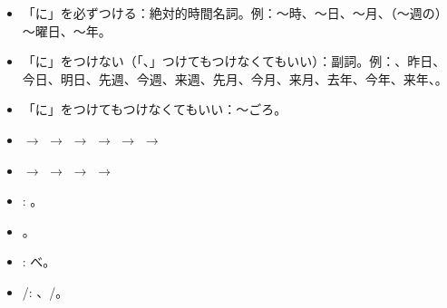 \documentclass[a4paper,12pt]{article}
\begin{document}
\begin{itemize}
\item 「に」を必ずつける：絶対的時間名詞。例：〜時、～日、～月、（〜週の）～曜日、～年。
\item 「に」をつけない（「、」つけてもつけなくてもいい）：副詞。例：、昨日、今日、明日、先週、今週、来週、先月、今月、来月、去年、今年、来年、。
\item 「に」をつけてもつけなくてもいい：〜ごろ。
\item {} $\rightarrow$  $\rightarrow$  $\rightarrow$  $\rightarrow$  $\rightarrow$  $\rightarrow$ 
\item {} $\rightarrow$  $\rightarrow$  $\rightarrow$  $\rightarrow$ 
\item {}: 。
\item {}。
\item {}: べ。
\item {}/: 、/。
\end{itemize}
\end{document}

